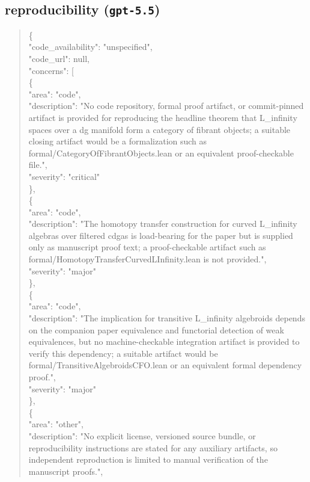 \documentclass[11pt]{article}
\begin{document}
\subsection*{reproducibility (\texttt{gpt-5.5})}
\begin{quote}\small\ttfamily\raggedright
\{\\
  "code\_availability": "unspecified",\\
  "code\_url": null,\\
  "concerns": [\\
    \{\\
      "area": "code",\\
      "description": "No code repository, formal proof artifact, or commit-pinned artifact is provided for reproducing the headline theorem that L\_infinity spaces over a dg manifold form a category of fibrant objects; a suitable closing artifact would be a formalization such as formal/CategoryOfFibrantObjects.lean or an equivalent proof-checkable file.",\\
      "severity": "critical"\\
    \},\\
    \{\\
      "area": "code",\\
      "description": "The homotopy transfer construction for curved L\_infinity algebras over filtered cdgas is load-bearing for the paper but is supplied only as manuscript proof text; a proof-checkable artifact such as formal/HomotopyTransferCurvedLInfinity.lean is not provided.",\\
      "severity": "major"\\
    \},\\
    \{\\
      "area": "code",\\
      "description": "The implication for transitive L\_infinity algebroids depends on the companion paper equivalence and functorial detection of weak equivalences, but no machine-checkable integration artifact is provided to verify this dependency; a suitable artifact would be formal/TransitiveAlgebroidsCFO.lean or an equivalent formal dependency proof.",\\
      "severity": "major"\\
    \},\\
    \{\\
      "area": "other",\\
      "description": "No explicit license, versioned source bundle, or reproducibility instructions are stated for any auxiliary artifacts, so independent reproduction is limited to manual verification of the manuscript proofs.",\\

\end{quote}
\end{document}
